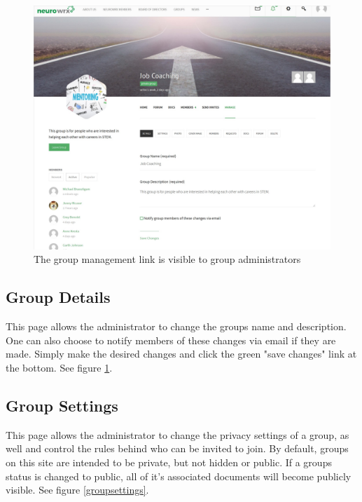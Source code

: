 \documentclass[10pt]{article}
\begin{document}
\begin{figure}[H]
    \centering
    \includegraphics[scale=0.25]{images/groupmanage.jpg}
    \caption{The group management link is visible to group administrators}
    \label{groupmanagelink}
\end{figure}

\subsection{Group Details}

\begin{flushleft}
This page allows the administrator to change the groups name and description.  One can also choose to notify members of these changes via email if they are made.  Simply make the desired changes and click the green "save changes" link at the bottom.  See figure \ref{groupmanagelink}.
\end{flushleft}

\subsection{Group Settings}

\begin{flushleft}
This page allows the administrator to change the privacy settings of a group, as well and control the rules behind who can be invited to join.  By default, groups on this site are intended to be private, but not hidden or public.  If a groups status is changed to public, all of it's associated documents will become publicly visible. See figure \ref{groupsettings}.
\end{flushleft}
\end{document}
